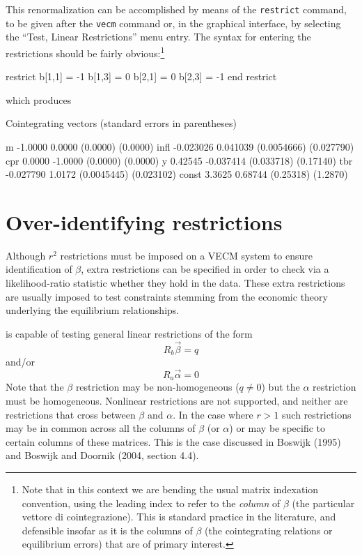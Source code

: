 This renormalization can be accomplished by means of the
\texttt{restrict} command, to be given after the \texttt{vecm} command
or, in the graphical interface, by selecting the ``Test, Linear
Restrictions'' menu entry. The syntax for entering the restrictions
should be fairly obvious:\footnote{Note that in this context we are
  bending the usual matrix indexation convention, using the leading
  index to refer to the \textit{column} of $\beta$ (the particular
  vettore di cointegrazione).  This is standard practice in the literature,
  and defensible insofar as it is the columns of $\beta$ (the
  cointegrating relations or equilibrium errors) that are of primary
  interest.}
\begin{code}
restrict
  b[1,1] = -1
  b[1,3] = 0
  b[2,1] = 0
  b[2,3] = -1
end restrict
\end{code}
which produces

\begin{code}
Cointegrating vectors (standard errors in parentheses)

m          -1.0000       0.0000 
           (0.0000)     (0.0000) 
infl     -0.023026     0.041039 
        (0.0054666)   (0.027790) 
cpr         0.0000      -1.0000 
           (0.0000)     (0.0000) 
y          0.42545    -0.037414 
         (0.033718)    (0.17140) 
tbr      -0.027790       1.0172 
        (0.0045445)   (0.023102) 
const       3.3625      0.68744 
          (0.25318)     (1.2870) 
\end{code}

\section{Over-identifying restrictions}
\label{sec:johansen-overid}

Although $r^2$ restrictions must be imposed on a VECM system to
ensure identification of $\beta$, extra restrictions can be specified
in order to check via a likelihood-ratio statistic whether they hold
in the data. These extra restrictions are usually imposed to test
constraints stemming from the economic theory underlying the
equilibrium relationships.

 is capable of testing general linear restrictions of the
form 
\begin{equation}
\label{eq:Rb}
R_b \vec{\beta} = q
\end{equation}
and/or
\begin{equation}
\label{eq:Ra}
R_a \vec{\alpha} = 0
\end{equation}
%
Note that the $\beta$ restriction may be non-homogeneous ($q \neq 0$)
but the $\alpha$ restriction must be homogeneous.  Nonlinear
restrictions are not supported, and neither are restrictions that
cross between $\beta$ and $\alpha$.  In the case where $r > 1$ such
restrictions may be in common across all the columns of $\beta$ (or
$\alpha$) or may be specific to certain columns of these matrices.
This is the case discussed in Boswijk (1995) and Boswijk and Doornik
(2004, section 4.4).

